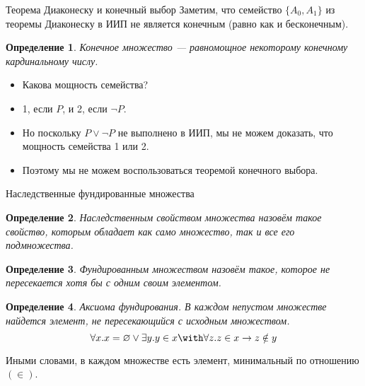 \documentclass[aspectratio=169]{beamer}
\newtheorem{dfn}{Определение}[section]
\begin{document}
\begin{frame}{Теорема Диаконеску и конечный выбор}
Заметим, что семейство $\{A_0, A_1\}$ из теоремы Диаконеску в ИИП не является конечным (равно как и бесконечным).
\begin{dfn}Конечное множество --- равномощное некоторому конечному кардинальному числу.\end{dfn}

\begin{itemize}
\item Какова мощность семейства? 
\item 1, если $P$, и 2, если $\neg P$. 
\item Но поскольку $P \vee \neg P$ не выполнено в ИИП, мы не можем
доказать, что мощность семейства 1 или 2.
\item Поэтому мы не можем воспользоваться теоремой конечного выбора.
\end{itemize}
\end{frame}

\begin{frame}{Наследственные фундированные множества}
\begin{dfn}Наследственным свойством множества назовём такое свойство, которым обладает как само
множество, так и все его подмножества.
\end{dfn}

\begin{dfn}Фундированным множеством назовём такое, которое не пересекается хотя бы с одним своим элементом.\end{dfn}

\begin{dfn}Аксиома фундирования. 
В каждом непустом множестве найдется элемент, не пересекающийся с исходным множеством.
$$\forall x .x = \varnothing \vee \exists y .y \in x \with \forall z.z \in x \rightarrow z \notin y$$
\end{dfn}

Иными словами, в каждом множестве есть элемент, минимальный по отношению $(\in)$.
\end{frame}
\end{document}
